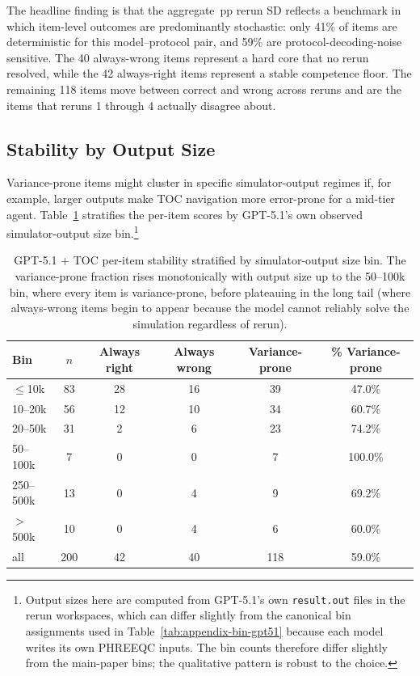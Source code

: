 \documentclass{article}
\begin{document}
The headline finding is that the aggregate \GPTFiveOneTOCRerunSD\,pp rerun SD reflects a benchmark in which item-level outcomes are predominantly stochastic: only 41\% of items are deterministic for this model--protocol pair, and 59\% are protocol-decoding-noise sensitive. The 40 always-wrong items represent a hard core that no rerun resolved, while the 42 always-right items represent a stable competence floor. The remaining 118 items move between correct and wrong across reruns and are the items that reruns 1 through 4 actually disagree about.

\subsection{Stability by Output Size}

Variance-prone items might cluster in specific simulator-output regimes if, for example, larger outputs make TOC navigation more error-prone for a mid-tier agent. Table~\ref{tab:appendix-stability-by-bin} stratifies the per-item scores by GPT-5.1's own observed simulator-output size bin.\footnote{Output sizes here are computed from GPT-5.1's own \texttt{result.out} files in the rerun workspaces, which can differ slightly from the canonical bin assignments used in Table~\ref{tab:appendix-bin-gpt51} because each model writes its own PHREEQC inputs. The bin counts therefore differ slightly from the main-paper bins; the qualitative pattern is robust to the choice.}

\begin{table}[h]
\centering
\small
\setlength{\tabcolsep}{6pt}
\begin{tabular}{lccccc}
\toprule
Bin & $n$ & Always right & Always wrong & Variance-prone & \% Variance-prone \\
\midrule
$\le$10k & 83 & 28 & 16 & 39 & 47.0\% \\
10--20k & 56 & 12 & 10 & 34 & 60.7\% \\
20--50k & 31 & 2 & 6 & 23 & 74.2\% \\
50--100k & 7 & 0 & 0 & 7 & 100.0\% \\
250--500k & 13 & 0 & 4 & 9 & 69.2\% \\
$>$500k & 10 & 0 & 4 & 6 & 60.0\% \\
\midrule
all & 200 & 42 & 40 & 118 & 59.0\% \\
\bottomrule
\end{tabular}
\caption{GPT-5.1 + TOC per-item stability stratified by simulator-output size bin. The variance-prone fraction rises monotonically with output size up to the 50--100k bin, where every item is variance-prone, before plateauing in the long tail (where always-wrong items begin to appear because the model cannot reliably solve the simulation regardless of rerun).}
\label{tab:appendix-stability-by-bin}
\end{table}
\end{document}
